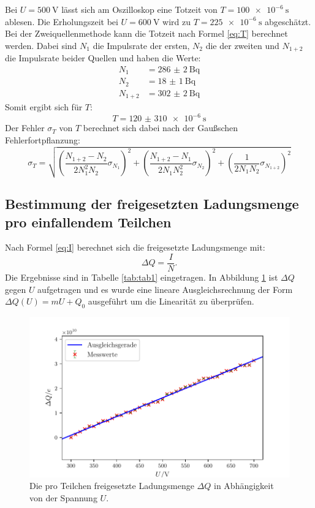 Bei $U=\SI{500}{\volt}$ lässt sich am Oszilloskop eine Totzeit von $T=\SI{100e-6}{\second}$ ablesen. Die Erholungszeit bei $U=\SI{600}{\volt}$ wird zu $T=\SI{225e-6}{\second}$ abgeschätzt.\\
Bei der Zweiquellenmethode kann die Totzeit nach Formel \eqref{eq:T} berechnet werden. Dabei sind $N_1$ die Impulsrate der ersten, $N_2$ die der zweiten und $N_{1+2}$ die Impulsrate beider Quellen und haben die Werte:
\begin{align*}
N_1 	&= \SI{286(2)}{\becquerel}\\
N_2 	&= \SI{18(1)}{\becquerel}\\
N_{1+2}	&= \SI{302(2)}{\becquerel}
\end{align*} 
Somit ergibt sich für $T$:
\begin{equation*}
T = \SI{120(310)e-6}{\second}
\end{equation*}
Der Fehler $\sigma_T$ von $T$ berechnet sich dabei nach der Gaußschen Fehlerfortpflanzung:
\begin{equation}
\sigma_T = \sqrt{\left(\frac{N_{1+2}-N_2}{2N_1^2N_2}\sigma_{N_1}\right)^2+\left(\frac{N_{1+2}-N_1}{2N_1N_2^2}\sigma_{N_2}\right)^2+\left(\frac{1}{2N_1N_2}\sigma_{N_{1+2}}\right)^2}
\end{equation}



\subsection{Bestimmung der freigesetzten Ladungsmenge pro einfallendem Teilchen}

Nach Formel \eqref{eq:I} berechnet sich die freigesetzte Ladungsmenge mit:
\begin{equation*}
\Delta Q = \frac{I}{N} \text{.}
\end{equation*}
Die Ergebnisse sind in Tabelle \ref{tab:tab1} eingetragen. In Abbildung \ref{fig:Graph2} ist $\Delta Q$ gegen $U$ aufgetragen und es wurde eine lineare Ausgleichsrechnung der Form $\Delta Q(U) = mU+Q_0$ ausgeführt um die Linearität zu überprüfen. 

\begin{figure}
	\centering
	\includegraphics[width=\linewidth-50pt,height=\textheight-50pt,keepaspectratio]{content/images/Graph2.pdf}
	\caption{Die pro Teilchen freigesetzte Ladungsmenge $\Delta Q$ in Abhängigkeit von der Spannung $U$.}
	\label{fig:Graph2}
\end{figure}